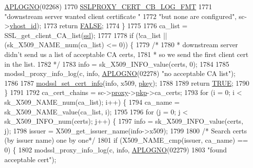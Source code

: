 \begin{DoxyCode}
      \hyperlink{group__APACHE__CORE__LOG_ga1dee8a07e06bc5b3de8b89662c2cd666}{APLOGNO}(02268)
1770                      \hyperlink{ssl__engine__kernel_8c_a686b5690c7c4712e04b3ad60f4d4eb76}{SSLPROXY\_CERT\_CB\_LOG\_FMT}
1771                      \textcolor{stringliteral}{"downstream server wanted client certificate "}
1772                      \textcolor{stringliteral}{"but none are configured"}, sc->\hyperlink{structSSLSrvConfigRec_a0517c50274f512bac682d23e0143f46d}{vhost\_id});
1773         \textcolor{keywordflow}{return} \hyperlink{group__MOD__SSL__PRIVATE_gaa93f0eb578d23995850d61f7d61c55c1}{FALSE};
1774     \}
1775 
1776     ca\_list = SSL\_get\_client\_CA\_list(\hyperlink{group__MOD__SSL_ga91d808d6c1c01029f9c9260b9b69a437}{ssl});
1777 
1778     \textcolor{keywordflow}{if} (!ca\_list || (sk\_X509\_NAME\_num(ca\_list) <= 0)) \{
1779         \textcolor{comment}{/*}
1780 \textcolor{comment}{         * downstream server didn't send us a list of acceptable CA certs,}
1781 \textcolor{comment}{         * so we send the first client cert in the list.}
1782 \textcolor{comment}{         */}
1783         info = sk\_X509\_INFO\_value(certs, 0);
1784 
1785         modssl\_proxy\_info\_log(c, info, \hyperlink{group__APACHE__CORE__LOG_ga1dee8a07e06bc5b3de8b89662c2cd666}{APLOGNO}(02278) \textcolor{stringliteral}{"no acceptable CA list"});
1786 
1787         \hyperlink{ssl__engine__kernel_8c_a044d627b253f550acf4e32f6ce16cfbe}{modssl\_set\_cert\_info}(info, x509, \hyperlink{group__APR__Util__DBM_ga1bbfe97dd2f6cc19a02af7fd6ef61fbd}{pkey});
1788 
1789         \textcolor{keywordflow}{return} \hyperlink{group__MOD__SSL__PRIVATE_gaa8cecfc5c5c054d2875c03e77b7be15d}{TRUE};
1790     \}
1791 
1792     ca\_cert\_chains = sc->\hyperlink{structSSLSrvConfigRec_ab5c01b000d9e3d7f5553862022295fba}{proxy}->\hyperlink{structmodssl__ctx__t_acb20829f01057f58d94469af712880c2}{pkp}->ca\_certs;
1793     \textcolor{keywordflow}{for} (i = 0; i < sk\_X509\_NAME\_num(ca\_list); i++) \{
1794         ca\_name = sk\_X509\_NAME\_value(ca\_list, i);
1795 
1796         \textcolor{keywordflow}{for} (j = 0; j < sk\_X509\_INFO\_num(certs); j++) \{
1797             info = sk\_X509\_INFO\_value(certs, j);
1798             issuer = X509\_get\_issuer\_name(info->x509);
1799 
1800             \textcolor{comment}{/* Search certs (by issuer name) one by one*/}
1801             \textcolor{keywordflow}{if} (X509\_NAME\_cmp(issuer, ca\_name) == 0) \{
1802                 modssl\_proxy\_info\_log(c, info, \hyperlink{group__APACHE__CORE__LOG_ga1dee8a07e06bc5b3de8b89662c2cd666}{APLOGNO}(02279)
1803                                       \textcolor{stringliteral}{"found acceptable cert"});

\end{DoxyCode}
